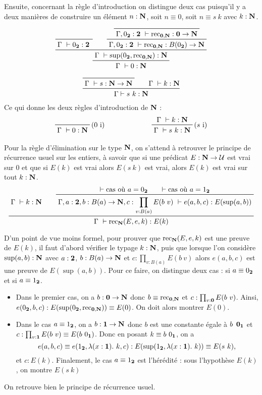 \documentclass[../../rapport.tex]{subfiles}
\begin{document}
  Ensuite, concernant la règle d'introduction on distingue deux cas puisqu'il y a deux manières de construire
  un élément $n : \mathbf N$, soit $n \equiv 0$, soit $n \equiv s\ k$ avec $k : \mathbf N$.

  $$
  \prfinterspace=2em
  \prftree
    {\prftree
      {\prfaxiom{\Gamma\ \vdash 0_{\2} : \2}}
      {\prftree
	{\prfaxiom{\Gamma, 0_{\2} : \2\ \vdash \rec_{\0, \N} : \0 \fun \N}}
      {\Gamma, 0_{\2} : \2\ \vdash \rec_{\0, \N} : B(0_{\2}) \fun \N}}
    {\Gamma\ \vdash \sup(0_{\2}, \rec_{\0, \N}) : \N}}
  {\Gamma\ \vdash 0 : \N}
  $$

  $$
  \prfinterspace=2em
  \prftree
    {\prfaxiom{\Gamma\ \vdash s : \N \fun \N}}
    {\Gamma\ \vdash k : \N}
  {\Gamma \vdash s\ k : \N}
  $$
  Ce qui donne les deux règles d'introduction de $\mathbf N$ :
  $$\begin{array}{cc}
    \prfbyaxiom{($0$ i)}{\Gamma\ \vdash 0 : \N}\hspace{2cm} & \prftree[r]{($s$ i)}{\Gamma\ \vdash k : \N}{\Gamma\ \vdash s\ k : \N}
  \end{array}$$

  Pour la règle d'élimination sur le type $\mathbf N$, on s'attend à retrouver le principe de récurrence usuel sur les entiers,
  à savoir que si une prédicat $E : \mathbf N \rightarrow \mathcal U$ est vrai sur $0$ et que si $E(k)$ est vrai alors $E(s\ k)$ est vrai,
  alors $E(k)$ est vrai sur tout $k : \mathbf N$.
  $$
  \prfinterspace=2em
  \prftree
    {\Gamma\ \vdash k : \N}
    {\prftree
      {\vdash \text{cas où $a = 0_{\2}$}}
      {\vdash \text{cas où $a = 1_{\2}$}}
    {\Gamma, a : \2, b : B(a) \fun \N, c : \prod_{v : B(a)}{E(b\ v)}\ \vdash e(a, b, c) : E(\sup(a, b))}}
    {\Gamma\ \vdash \rec_{\N}(E, e, k) : E(k)}
  $$

  D'un point de vue moins formel, pour prouver que $\operatorname{rec}_{\mathbf N}(E, e, k)$ est une preuve de $E(k)$,
  il faut d'abord vérifier le typage $k : \mathbf N$, puis que lorsque l'on considère $\sup(a, b) : \mathbf N$ avec
  $a : \operatorname{\textbf{2}}$, $b : B(a) \rightarrow \mathbf N$ et $c : \prod_{v : B(a)}{E(b\ v)}$ alors $e(a, b, c)$ est une preuve de $E(\sup(a, b))$.
  Pour ce faire, on distingue deux cas : si $a \equiv 0_{\operatorname{\textbf{2}}}$ et si $a \equiv 1_{\operatorname{\textbf{2}}}$.
  \begin{itemize}
    \item Dans le premier cas, on a $b : \operatorname{\textbf{0}} \rightarrow \mathbf N$ donc $b \equiv \operatorname{rec}_{\operatorname{\textbf{0}}, \mathbf N}$ et $c : \prod_{v:\0}{E(b\ v)}$.
      Ainsi, $e(0_{\operatorname{\textbf{2}}}, b, c) : E(\sup(0_{\operatorname{\textbf{2}}}, \operatorname{rec}_{\operatorname{\textbf{0}},\mathbf N})) \equiv E(0)$. On doit alors montrer $E(0)$.
    \item Dans le cas $a \equiv 1_{\operatorname{\textbf{2}}}$, on a $b : \operatorname{\textbf{1}} \rightarrow \mathbf N$ donc $b$ est une constante égale à $b\ \operatorname{\textbf{0}}_{\operatorname{\textbf{1}}}$ et
      $c : \prod_{v : \1}{E(b\ v)} \equiv E(b\ 0_{\1})$.
      Donc en posant $k \equiv b\ 0_{\1}$, on a
      $$e(a, b, c) \equiv e(1_{\operatorname{\textbf{2}}}, \lambda(x : \operatorname{\textbf{1}}).\ k, c) : E(\sup(1_{\operatorname{\textbf{2}}}, \lambda(x : \operatorname{\textbf{1}}).\ k)) \equiv E(s\ k),$$
      et $c : E(k)$.
      Finalement, le cas $a \equiv 1_{\operatorname{\textbf{2}}}$ est l'hérédité : sous l'hypothèse $E(k)$, on montre $E(s\ k)$
  \end{itemize}
  On retrouve bien le principe de récurrence usuel.
\end{document}
